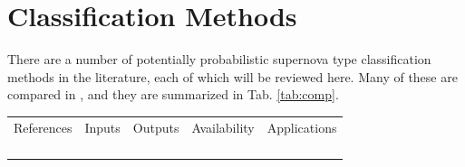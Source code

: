 \documentclass[12pt, onecolumn]{emulateapj}
\newcommand{\textul}{\underline}
\begin{document}
%
%

\section{Classification Methods}

There are a number of potentially probabilistic supernova type classification methods in the literature, each of which will be reviewed here.  Many of these are compared in \citet{Kessler10}, and they are summarized in Tab. \ref{tab:comp}.  

\begin{tabular}{ccccc}
\label{tab:comp}
References&Inputs&Outputs&Availability&Applications\\
\citet{Kuznetsova06}&&&&\\
\citet{Poznanski06}&&&&\\
\citet{Rodney09, Rodney10}&&&&\\
\citet{Sako11}&&&&\citet{Sako14}\\
\end{tabular}
\end{document}
